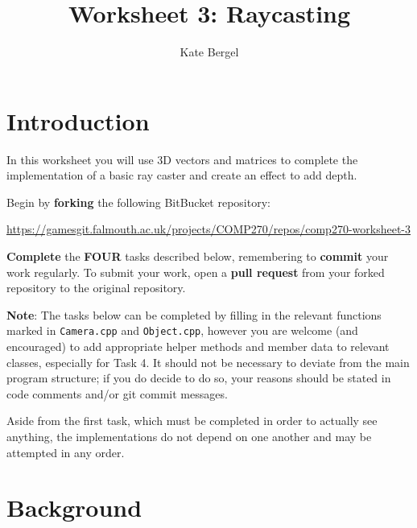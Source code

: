 \documentclass{../../../fal_assignment}
\title{Worksheet 3: Raycasting}
\author{Kate Bergel}
\begin{document}
\maketitle

\section*{Introduction}

In this worksheet you will use 3D vectors and matrices to complete the implementation of a basic ray caster and create an effect to add depth.

Begin by \textbf{forking} the following BitBucket repository:

\begin{center}
	\url{https://gamesgit.falmouth.ac.uk/projects/COMP270/repos/comp270-worksheet-3}
\end{center}

\textbf{Complete} the \textbf{FOUR} tasks described below, remembering to \textbf{commit} your work regularly.
To submit your work, open a \textbf{pull request} from your forked repository to the original repository.

\textbf{Note}: The tasks below can be completed by filling in the relevant functions marked in \texttt{Camera.cpp} and \texttt{Object.cpp}, however you are welcome (and encouraged) to add appropriate helper methods and member data to relevant classes, especially for Task 4. It should not be necessary to deviate from the main program structure; if you do decide to do so, your reasons should be stated in code comments and/or git commit messages.

Aside from the first task, which must be completed in order to actually see anything, the implementations do not depend on one another and may be attempted in any order.

\section*{Background}
\end{document}
